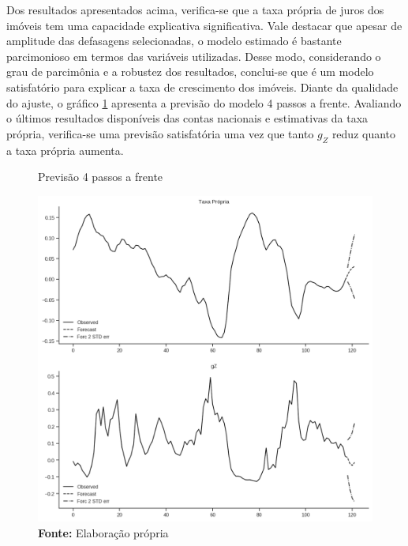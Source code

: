 Dos resultados apresentados acima, verifica-se que a taxa própria de juros dos imóveis tem uma capacidade explicativa significativa. Vale destacar que apesar de amplitude das defasagens selecionadas, o modelo estimado é bastante parcimonioso em termos das variáveis utilizadas. Desse modo, considerando o grau de parcimônia e a robustez dos resultados, conclui-se que é um modelo satisfatório para explicar a taxa de crescimento dos imóveis. Diante da qualidade do ajuste, o gráfico \ref{previsao} apresenta a previsão do modelo 4 passos a frente. Avaliando o últimos resultados disponíveis das contas nacionais e estimativas da taxa própria, verifica-se uma previsão satisfatória uma vez que tanto $g_Z$ reduz quanto a taxa própria aumenta.

\begin{figure}[htb]
	\centering
	\caption{Previsão 4 passos a frente}
	\label{previsao}
	\includegraphics[width=\textwidth]{Fatos_Estilizados/Figs/Previsao_VECM.png}
	\caption*{\textbf{Fonte:} Elaboração própria}
\end{figure}

